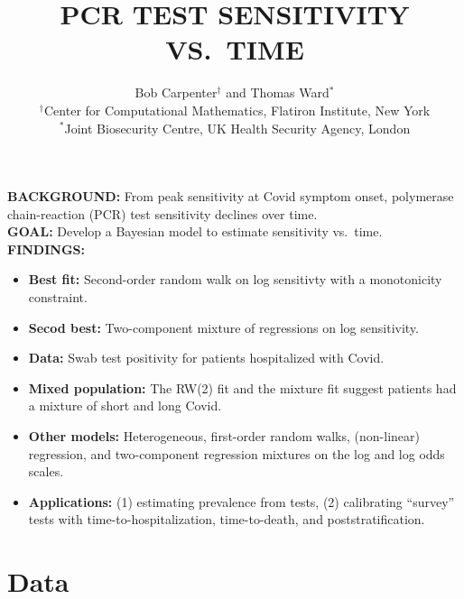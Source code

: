 \documentclass[plainboxedsections, 25pt]{sciposter}
\title{
  \titlesize \bfseries \vspace*{24pt}
   PCR TEST SENSITIVITY VS.\ TIME
}
\author{
  \begin{center}
  \LARGE Bob Carpenter$^\dagger$ and Thomas Ward$^*$  \\
  \vspace*{12pt}
  \normalsize
  $^\dagger$Center for Computational Mathematics, Flatiron Institute, New York
  \\
  $^*$Joint Biosecurity Centre, UK Health Security Agency, London
  \end{center}
}
\begin{document}

\setlength{\fboxrule}{9pt}
\setlength{\fboxsep}{16pt}

\begin{multicols}{2}
\begin{mdframed}[hidealllines = true, backgroundcolor = Cerulean!10]
{\large
\textbf{BACKGROUND:} From peak sensitivity at Covid symptom onset,
polymerase chain-reaction (PCR) test sensitivity declines over time.
\\[-0.2in]

\textbf{GOAL:} Develop a Bayesian model to estimate sensitivity vs.\ time.
\\[-0.2in]

\textbf{FINDINGS:}
\begin{itemize}
%
\item {\bfseries Best fit:} Second-order random walk on log sensitivty with a
  monotonicity constraint. 
%
\item {\bfseries Secod best:} Two-component mixture of regressions on
  log sensitivity. 
%
\item {\bfseries Data:} Swab test positivity for patients hospitalized
  with Covid. 
%  
\item {\bfseries Mixed population:} The RW(2) fit and the mixture fit
  suggest patients had a mixture of short and long Covid.

\item {\bfseries Other models:} Heterogeneous, first-order
  random walks, (non-linear) regression, and two-component regression mixtures on
  the log and log odds scales.

\item {\bfseries Applications:} (1) estimating prevalence from tests,
  (2) calibrating ``survey'' tests with time-to-hospitalization,
  time-to-death, and poststratification.
\end{itemize}
}
\end{mdframed}

\section{Data}


\end{multicols}
\end{document}
